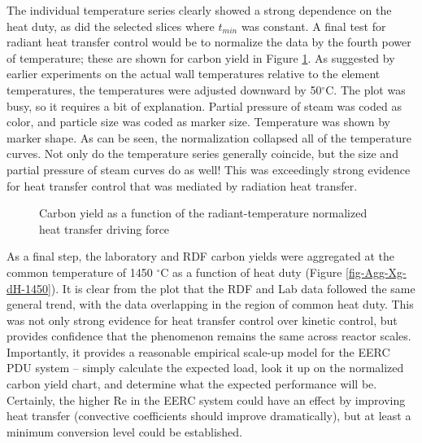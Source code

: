 \documentclass[11pt,twocolumn]{article}
\begin{document}

The individual temperature series clearly showed a strong dependence on the heat duty, as did the selected slices where $t_{min}$ was constant.  A final test for radiant heat transfer control would be to normalize the data by the fourth power of temperature; these are shown for carbon yield in Figure \ref{fig-Lab-Xg-dH-norm}. As suggested by earlier experiments on the actual wall temperatures relative to the element temperatures, the temperatures were adjusted downward by 50$^{\circ}$C. The plot was busy, so it requires a bit of explanation.  Partial pressure of steam was coded as color, and particle size was coded as marker size.  Temperature was shown by marker shape.  As can be seen, the normalization collapsed all of the temperature curves.  Not only do the temperature series generally coincide, but the size and partial pressure of steam curves do as well!  This was exceedingly strong evidence for heat transfer control that was mediated by radiation heat transfer.

\begin{figure}[hp]

\caption{Carbon yield as a function of the radiant-temperature normalized heat transfer driving force}
\label{fig-Lab-Xg-dH-norm}
\end{figure}


As a final step, the laboratory and RDF carbon yields were aggregated at the common temperature of 1450 $^{\circ}$C as a function of heat duty (Figure \ref{fig-Agg-Xg-dH-1450}).  It is clear from the plot that the RDF and Lab data followed the same general trend, with the data overlapping in the region of common heat duty.  This was not only strong evidence for heat transfer control over kinetic control, but provides confidence that the phenomenon remains the same across reactor scales.  Importantly, it provides a reasonable empirical scale-up model for the EERC PDU system -- simply calculate the expected load, look it up on the normalized carbon yield chart, and determine what the expected performance will be.  Certainly, the higher Re in the EERC system could have an effect by improving heat transfer (convective coefficients should improve dramatically), but at least a minimum conversion level could be established.
\end{document}
